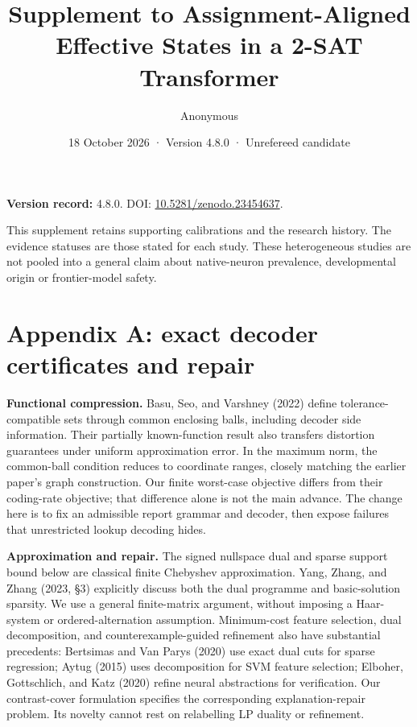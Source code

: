 \documentclass[
  british,
  11pt,
  a4paper,
]{article}
\title{Supplement to Assignment-Aligned Effective States in a 2-SAT
Transformer}
\author{Anonymous}
\date{18 October 2026 · Version 4.8.0 · Unrefereed candidate}
\begin{document}
\maketitle

{
\setcounter{tocdepth}{3}
\tableofcontents
}
\textbf{Version record:} 4.8.0. DOI:
\href{https://doi.org/10.5281/zenodo.23454637}{10.5281/zenodo.23454637}.

This supplement retains supporting calibrations and the research
history. The evidence statuses are those stated for each study. These
heterogeneous studies are not pooled into a general claim about
native-neuron prevalence, developmental origin or frontier-model safety.

\section{Appendix A: exact decoder certificates and
repair}\label{appendix-a-exact-decoder-certificates-and-repair}

\textbf{Functional compression.} Basu, Seo, and Varshney (2022) define
tolerance-compatible sets through common enclosing balls, including
decoder side information. Their partially known-function result also
transfers distortion guarantees under uniform approximation error. In
the maximum norm, the common-ball condition reduces to coordinate
ranges, closely matching the earlier paper's graph construction. Our
finite worst-case objective differs from their coding-rate objective;
that difference alone is not the main advance. The change here is to fix
an admissible report grammar and decoder, then expose failures that
unrestricted lookup decoding hides.

\textbf{Approximation and repair.} The signed nullspace dual and sparse
support bound below are classical finite Chebyshev approximation. Yang,
Zhang, and Zhang (2023, §3) explicitly discuss both the dual programme
and basic-solution sparsity. We use a general finite-matrix argument,
without imposing a Haar-system or ordered-alternation assumption.
Minimum-cost feature selection, dual decomposition, and
counterexample-guided refinement also have substantial precedents:
Bertsimas and Van Parys (2020) use exact dual cuts for sparse
regression; Aytug (2015) uses decomposition for SVM feature selection;
Elboher, Gottschlich, and Katz (2020) refine neural abstractions for
verification. Our contrast-cover formulation specifies the corresponding
explanation-repair problem. Its novelty cannot rest on relabelling LP
duality or refinement.
\end{document}

